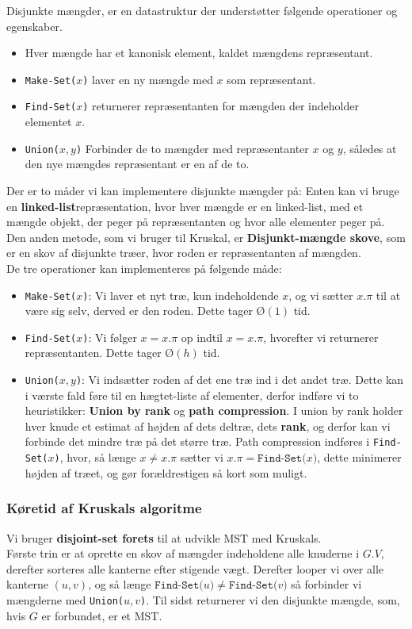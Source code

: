 Disjunkte mængder, er en datastruktur der understøtter følgende operationer og egenskaber.\\

\begin{itemize}
\item Hver mængde har et kanonisk element, kaldet mængdens repræsentant.
\item \texttt{Make-Set($x$)} laver en ny mængde med $x$ som repræsentant.
\item \texttt{Find-Set($x$)} returnerer repræsentanten for mængden der indeholder elementet $x$.
\item \texttt{Union($x,y$)} Forbinder de to mængder med repræsentanter $x$ og $y$, således at den nye mængdes repræsentant er en af de to.
\end{itemize}

Der er to måder vi kan implementere disjunkte mængder på: Enten kan vi bruge en \textbf{linked-list}repræsentation, hvor hver mængde er en linked-list, med et mængde objekt, der peger på repræsentanten og hvor alle elementer peger på. Den anden metode, som vi bruger til Kruskal, er \textbf{Disjunkt-mængde skove}, som er en skov af disjunkte træer, hvor roden er repræsentanten af mængden.\\

De tre operationer kan implementeres på følgende måde:
\begin{itemize}
\item \texttt{Make-Set($x$)}: Vi laver et nyt træ, kun indeholdende $x$, og vi sætter $x.\pi$ til at være sig selv, derved er den roden. Dette tager $Ø(1)$ tid.
\item \texttt{Find-Set($x$)}: Vi følger $x = x.\pi$ op indtil $x = x.\pi$, hvorefter vi returnerer repræsentanten. Dette tager $Ø(h)$ tid.
\item \texttt{Union($x,y$)}: Vi indsætter roden af det ene træ ind i det andet træ. Dette kan i værste fald føre til en hægtet-liste af elementer, derfor indføre vi to heuristikker: \textbf{Union by rank} og \textbf{path compression}. I union by rank holder hver knude et estimat af højden af dets deltræ, dets \textbf{rank}, og derfor kan vi forbinde det mindre træ på det større træ. Path compression indføres i \texttt{Find-Set($x$)}, hvor, så længe $x \neq x.\pi$ sætter vi $x.\pi = \texttt{Find-Set($x$)}$, dette minimerer højden af træet, og gør forældrestigen så kort som muligt.
\end{itemize}

\subsubsection{Køretid af Kruskals algoritme}
Vi bruger \textbf{disjoint-set forets} til at udvikle MST med Kruskals.\\
Første trin er at oprette en skov af mængder indeholdene alle knuderne i $G.V$, derefter sorteres alle kanterne efter stigende vægt. Derefter looper vi over alle kanterne $(u,v)$, og så længe $\texttt{Find-Set($u$)} \neq \texttt{Find-Set($v$)}$ så forbinder vi mængderne med \texttt{Union($u,v$)}. Til sidst returnerer vi den disjunkte mængde, som, hvis $G$ er forbundet, er et MST.\\

